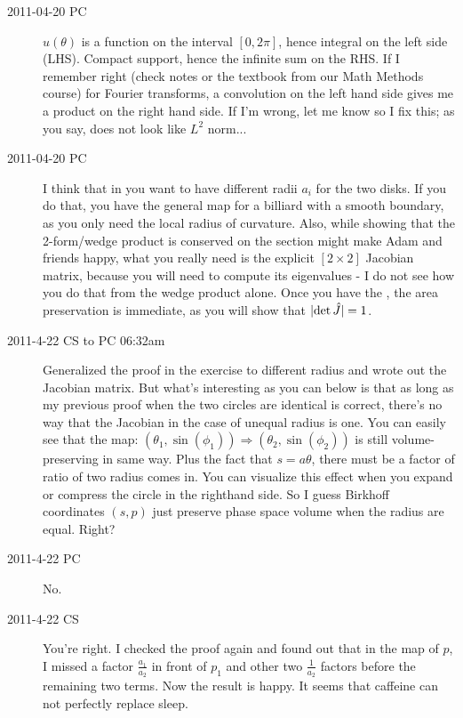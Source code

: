 \begin{description}
\item[2011-04-20 PC] $u(\theta)$ is a function on the interval $[0,2\pi]$,
hence integral on the left side (LHS). Compact support, hence the infinite sum
on the RHS. If I remember right (check notes or the textbook from
our Math Methods course) for Fourier transforms, a convolution on the
left hand side gives me a product on the right hand side. If I'm wrong,
let me know so I fix this; as you say, does not look like $L^2$ norm...

\item[2011-04-20 PC]  I think that in  you want to
have different radii $a_i$ for the two disks. If you do that, you have
the general map for a billiard with a smooth boundary, as you only need the
local radius of curvature. Also, while showing that
the 2-form/wedge product is conserved on the \Poincare section might make
Adam and friends happy, what you really need is the explicit $[2\!\times\!2]$
Jacobian matrix, because you will need to compute its eigenvalues - I do not see
how you do that from the wedge product alone. Once you have the \jacobianM,
the area preservation is immediate, as you will show that $|\mbox{\rm det}\, \hat{J} |= 1$.

\item[2011-4-22 CS to PC 06:32am]  Generalized the proof in the exercise
to different radius and wrote out the Jacobian matrix. But what's
interesting as you can below is that as long as my previous proof when
the two circles are identical is correct, there's no way that the
Jacobian in the case of unequal radius is one. You can easily see that
the map: $(\theta_1, \sin(\phi_1))\Rightarrow(\theta_2, \sin(\phi_2))$ is
still volume-preserving in same way. Plus the fact that $s=a\theta$,
there must be a factor of ratio of two radius comes in. You can visualize
this effect when you expand or compress the circle in the righthand side.
So I guess Birkhoff coordinates $(s,p)$ just preserve phase space volume
when the radius are equal. Right?

\item[2011-4-22 PC] No.

\item[2011-4-22 CS]
You're right. I checked the proof again and found out that in the map of
$p$, I missed a factor $\frac{a_1}{a_2}$ in front of $p_1$ and other two
$\frac{1}{a_2}$ factors before the remaining two terms. Now the result is
happy. It seems that caffeine can not perfectly replace sleep.


\end{description}

